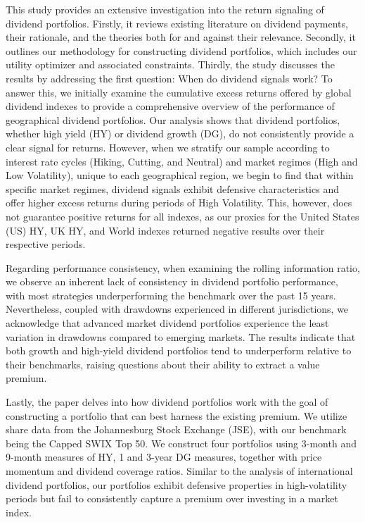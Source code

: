 \documentclass[11pt,preprint, authoryear]{elsarticle}
\numberwithin{equation}{section}
\numberwithin{figure}{section}
\numberwithin{table}{section}
\begin{document}
This study provides an extensive investigation into the return signaling
of dividend portfolios. Firstly, it reviews existing literature on
dividend payments, their rationale, and the theories both for and
against their relevance. Secondly, it outlines our methodology for
constructing dividend portfolios, which includes our utility optimizer
and associated constraints. Thirdly, the study discusses the results by
addressing the first question: When do dividend signals work? To answer
this, we initially examine the cumulative excess returns offered by
global dividend indexes to provide a comprehensive overview of the
performance of geographical dividend portfolios. Our analysis shows that
dividend portfolios, whether high yield (HY) or dividend growth (DG), do
not consistently provide a clear signal for returns. However, when we
stratify our sample according to interest rate cycles (Hiking, Cutting,
and Neutral) and market regimes (High and Low Volatility), unique to
each geographical region, we begin to find that within specific market
regimes, dividend signals exhibit defensive characteristics and offer
higher excess returns during periods of High Volatility. This, however,
does not guarantee positive returns for all indexes, as our proxies for
the United States (US) HY, UK HY, and World indexes returned negative
results over their respective periods.

Regarding performance consistency, when examining the rolling
information ratio, we observe an inherent lack of consistency in
dividend portfolio performance, with most strategies underperforming the
benchmark over the past 15 years. Nevertheless, coupled with drawdowns
experienced in different jurisdictions, we acknowledge that advanced
market dividend portfolios experience the least variation in drawdowns
compared to emerging markets. The results indicate that both growth and
high-yield dividend portfolios tend to underperform relative to their
benchmarks, raising questions about their ability to extract a value
premium.

Lastly, the paper delves into how dividend portfolios work with the goal
of constructing a portfolio that can best harness the existing premium.
We utilize share data from the Johannesburg Stock Exchange (JSE), with
our benchmark being the Capped SWIX Top 50. We construct four portfolios
using 3-month and 9-month measures of HY, 1 and 3-year DG measures,
together with price momentum and dividend coverage ratios. Similar to
the analysis of international dividend portfolios, our portfolios
exhibit defensive properties in high-volatility periods but fail to
consistently capture a premium over investing in a market index.
\end{document}
